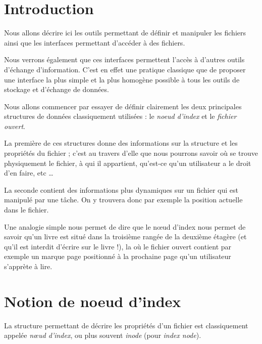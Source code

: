 %
\section{Introduction}

   Nous allons décrire ici les outils permettant de définir et
manipuler les fichiers ainsi que les interfaces permettant d'accéder à
des fichiers.

   Nous verrons également que ces interfaces permettent l'accès à d'autres outils
d'échange d'information. C'est en effet une pratique classique que de
proposer une interface la plus simple et la plus homogène possible à
tous les outils de stockage et d'échange de données.

   Nous allons commencer par essayer de définir clairement les deux
principales structures de données classiquement utilisées : le {\em
  noeud d'index} et le {\em fichier ouvert}.

   La première de ces structures donne des informations sur la
structure et les propriétés du fichier ; c'est au travers d'elle que
nous pourrons savoir où se trouve physiquement le fichier, à qui il
appartient, qu'est-ce qu'un utilisateur a le droit d'en faire, etc
\ldots

   La seconde contient des informations plus dynamiques sur un fichier
qui est manipulé par une tâche. On y trouvera donc par exemple la
position actuelle dans le fichier.

   Une analogie simple nous permet de dire que le n\oe{}ud d'index
nous permet de savoir qu'un livre est situé dans la troisième rangée
de la deuxième étagère (et qu'il est interdit d'écrire sur le livre
!), la où le fichier ouvert contient par exemple un marque page
positionné à la prochaine page qu'un utilisateur s'apprète à lire.

%
\section{Notion de noeud d'index}

   La structure permettant de décrire les propriétés d'un fichier est
classiquement appelée {\em n\oe{}ud d'index}, ou plus souvent {\em
  inode} (pour {\em index node}).

